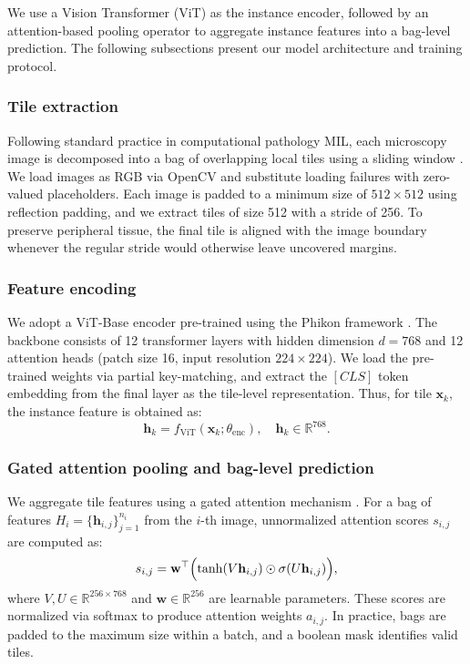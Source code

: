 \documentclass[sigconf,review,anonymous]{acmart}
\theoremstyle{remark}
\begin{document}
We use a Vision Transformer (ViT) \cite{dosovitskiy2020image} as the instance encoder, followed by an attention-based pooling operator \cite{ilse2018attention} to aggregate instance features into a bag-level prediction. The following subsections present our model architecture and training protocol.

\subsubsection{Tile extraction}

Following standard practice in computational pathology MIL, each microscopy image is decomposed into a bag of overlapping local tiles using a sliding window \cite{campanella2019clinical,lu2021data}. We load images as RGB via OpenCV \cite{bradski2000opencv} and substitute loading failures with zero-valued placeholders. Each image is padded to a minimum size of $512\times512$ using reflection padding, and we extract tiles of size 512 with a stride of 256. To preserve peripheral tissue, the final tile is aligned with the image boundary whenever the regular stride would otherwise leave uncovered margins.

\subsubsection{Feature encoding}

We adopt a ViT-Base encoder pre-trained using the Phikon framework \cite{filiot2023scaling}. The backbone consists of 12 transformer layers with hidden dimension \( d = 768 \) and 12 attention heads (patch size 16, input resolution \(224\times224\)). We load the pre-trained weights via partial key-matching, and extract the \([CLS]\) token embedding from the final layer as the tile-level representation. Thus, for tile \(\mathbf{x}_k\), the instance feature is obtained as:
\begin{equation*}
    \mathbf{h}_k = f_{\text{ViT}}(\mathbf{x}_k; \theta_{\text{enc}}), \quad \mathbf{h}_k \in \mathbb{R}^{768}.
\end{equation*}

\subsubsection{Gated attention pooling and bag-level prediction}\label{S3-1-3}
We aggregate tile features using a gated attention mechanism \cite{ilse2018attention}. For a bag of features \( H_i = \{\mathbf{h}_{i,j}\}_{j=1}^{n_i} \) from the \( i \)-th image, unnormalized attention scores \( s_{i,j} \) are computed as:
\begin{equation*}
    s_{i,j} = \mathbf{w}^\top \Bigl(\tanh(V\mathbf{h}_{i,j}) \odot \sigma(U\mathbf{h}_{i,j})\Bigr),
\end{equation*}
where \( V, U \in \mathbb{R}^{256 \times 768} \) and \( \mathbf{w} \in \mathbb{R}^{256} \) are learnable parameters. These scores are normalized via softmax to produce attention weights \( a_{i,j} \). In practice, bags are padded to the maximum size within a batch, and a boolean mask identifies valid tiles.
\end{document}
